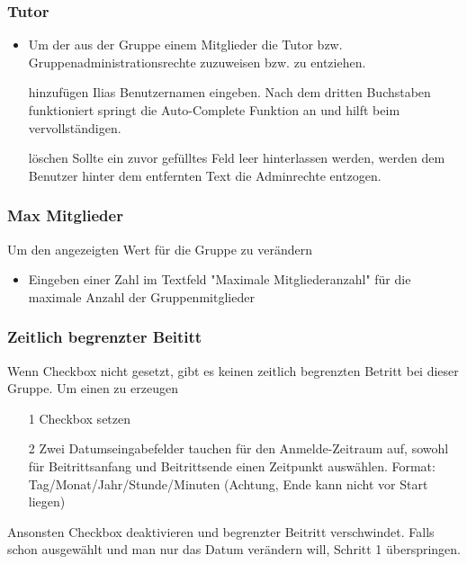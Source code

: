 \subsubsection{Tutor}
\begin{itemize}
	\item Um der aus der Gruppe einem Mitglieder die Tutor bzw. Gruppenadministrationsrechte zuzuweisen bzw. zu entziehen. 
	\item[hinzufügen] Ilias Benutzernamen eingeben. Nach dem dritten Buchstaben funktioniert springt die Auto-Complete Funktion an und hilft beim vervollständigen. 
	\item[löschen] Sollte ein zuvor gefülltes Feld leer hinterlassen werden, werden dem Benutzer hinter dem entfernten Text die Adminrechte entzogen.
\end{itemize}

\subsubsection{Max Mitglieder}
Um den angezeigten Wert für die Gruppe zu verändern
\begin{itemize}
	\item Eingeben einer Zahl im Textfeld "Maximale Mitgliederanzahl" für die maximale Anzahl der Gruppenmitglieder 
\end{itemize}


\subsubsection{Zeitlich begrenzter Beititt}
Wenn Checkbox nicht gesetzt, gibt es keinen zeitlich begrenzten Betritt bei dieser Gruppe. Um einen zu erzeugen
\begin{itemize}
\item[1] Checkbox setzen 
\item[2] Zwei Datumseingabefelder tauchen für den Anmelde-Zeitraum auf, sowohl für Beitrittsanfang und Beitrittsende einen Zeitpunkt auswählen. Format: Tag/Monat/Jahr/Stunde/Minuten 
(Achtung, Ende kann nicht vor Start liegen)
\end{itemize}

Ansonsten Checkbox deaktivieren und begrenzter Beitritt verschwindet. 
Falls schon ausgewählt und man nur das Datum verändern will, Schritt 1 überspringen. 


\clearpage


